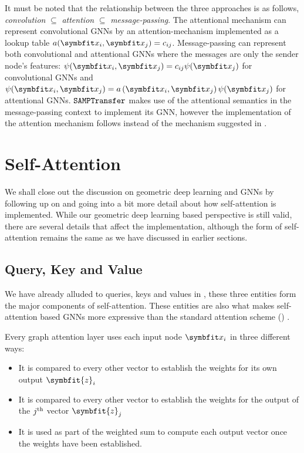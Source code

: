 It must be noted that the relationship between the three approaches is as follows, \textit{convolution} $\subseteq$ \textit{attention} $\subseteq$ \textit{message-passing}. The attentional mechanism can represent convolutional GNNs by an attention-mechanism implemented as a lookup table $a(\bfitx_i, \bfitx_j) = c_{ij}$. Message-passing can represent both convolutional and attentional GNNs where the messages are only the sender node's features: $\psi(\bfitx_i, \bfitx_j)=c_{ij}\psi(\bfitx_j)$ for convolutional GNNs and $\psi(\bfitx_i, \bfitx_j)=a\left(\bfitx_{i}, \bfitx_{j}\right)\psi(\bfitx_j)$ for attentional GNNs. $\texttt{SAMPTransfer}$ makes use of the attentional semantics in the message-passing context to implement its GNN, however the implementation of the attention mechanism follows \parencite{vaswani2017attention} instead of the mechanism suggested in \parencite{velic018graph}.

\section{Self-Attention}\label{sec:self-attention}

We shall close out the discussion on geometric deep learning and GNNs by following up on  and going into a bit more detail about how self-attention is implemented. While our geometric deep learning based perspective is still valid, there are several details that affect the implementation, although the form of self-attention remains the same as we have discussed in earlier sections.

\subsection{Query, Key and Value}\label{sec:attn-qkv}
We have already alluded to queries, keys and values in , these three entities form the major components of self-attention. These entities are also what makes self-attention based GNNs more expressive than the standard attention scheme () \parencite{brody2021attentive, Bronstein2021, Dwivedi2020}.

Every graph attention layer uses each input node $\bfitx_i$ in three different ways:
\begin{itemize}
    \item It is compared to every other vector to establish the weights for its own output $\symbfit{z}_i$
    \item It is compared to every other vector to establish the weights for the output of the $j\textsuperscript{th}$ vector $\symbfit{z}_j$
    \item It is used as part of the weighted sum to compute each output vector once the weights have been established.
\end{itemize}

